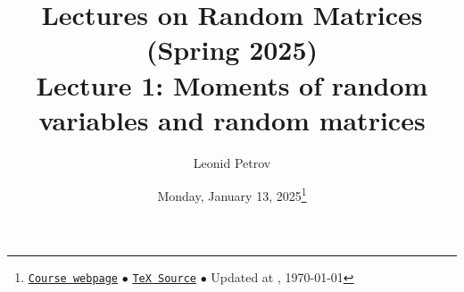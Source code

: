 \documentclass[letterpaper,11pt,oneside,reqno]{article}
\numberwithin{equation}{section}
\theoremstyle{definition}
\begin{document}
\title{Lectures on Random Matrices
(Spring 2025)
\\Lecture 1: Moments of random variables and random
matrices}


\date{Monday, January 13, 2025\footnote{\href{https://lpetrov.cc/rmt25/}{\texttt{Course webpage}}
$\bullet$ \href{https://lpetrov.cc/rmt25/rmt25-notes/rmt2025-l01.tex}{\texttt{TeX Source}}
$\bullet$
Updated at \currenttime, \today}}



\author{Leonid Petrov}


\maketitle

\tableofcontents
\end{document}
